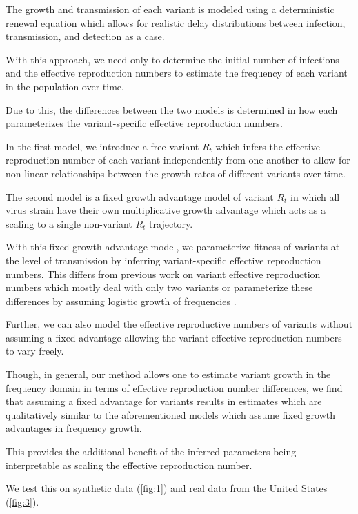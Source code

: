 \documentclass[11pt,oneside,letterpaper]{article}
\begin{document}
The growth and transmission of each variant is modeled using a deterministic renewal equation which allows for realistic delay distributions between infection, transmission, and detection as a case.

With this approach, we need only to determine the initial number of infections and the effective reproduction numbers to estimate the frequency of each variant in the population over time.

Due to this, the differences between the two models is determined in how each parameterizes the variant-specific effective reproduction numbers. 

In the first model, we introduce a free variant $R_{t}$ which infers the effective reproduction number of each variant independently from one another to allow for non-linear relationships between the growth rates of different variants over time. 

The second model is a fixed growth advantage model of variant $R_{t}$ in which all virus strain have their own multiplicative growth advantage which acts as a scaling to a single non-variant $R_{t}$ trajectory.

With this fixed growth advantage model, we parameterize fitness of variants at the level of transmission by inferring variant-specific effective reproduction numbers. This differs from previous work on variant effective reproduction numbers which mostly deal with only two variants or parameterize these differences by assuming logistic growth of frequencies \cite{Vhringer2021}. %

Further, we can also model the effective reproductive numbers of variants without assuming a fixed advantage allowing the variant effective reproduction numbers to vary freely. 

Though, in general, our method allows one to estimate variant growth in the frequency domain in terms of effective reproduction number differences, we find that assuming a fixed advantage for variants results in estimates which are qualitatively similar to the aforementioned models which assume fixed growth advantages in frequency growth.

This provides the additional benefit of the inferred parameters being interpretable as scaling the effective reproduction number.

We test this on synthetic data (\ref{fig:1}) and real data from the United States (\ref{fig:3}). %
\end{document}
